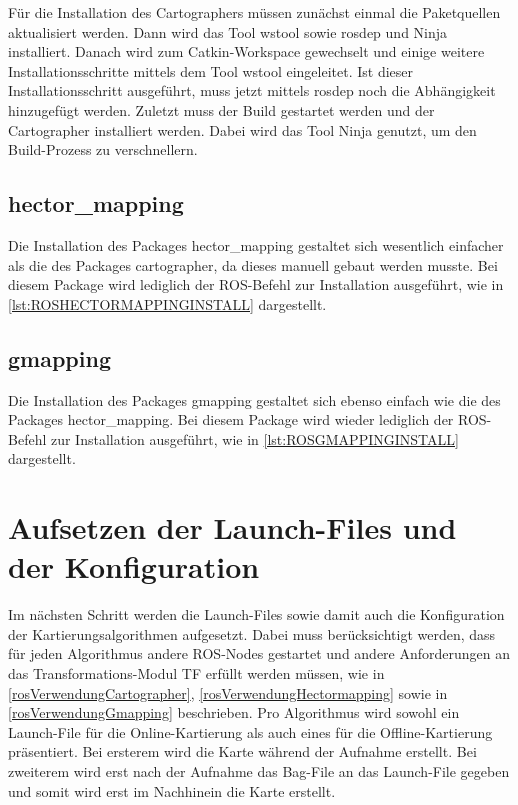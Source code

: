 Für die Installation des Cartographers müssen zunächst einmal die Paketquellen aktualisiert werden. Dann wird das Tool wstool sowie rosdep und Ninja installiert. Danach wird zum Catkin-Workspace gewechselt und einige weitere Installationsschritte mittels dem Tool wstool eingeleitet. Ist dieser Installationsschritt ausgeführt, muss jetzt mittels rosdep noch die Abhängigkeit hinzugefügt werden. Zuletzt muss der Build gestartet werden und der Cartographer installiert werden. Dabei wird das Tool Ninja genutzt, um den Build-Prozess zu verschnellern. \autocite{cartographerInstallation}



\subsection{hector\_mapping}

Die Installation des Packages hector\_mapping gestaltet sich wesentlich einfacher als die des Packages cartographer, da dieses manuell gebaut werden musste. Bei diesem Package wird lediglich der \ac{ROS}-Befehl zur Installation ausgeführt, wie in \autoref{lst:ROSHECTORMAPPINGINSTALL} dargestellt.



\subsection{gmapping}

Die Installation des Packages gmapping gestaltet sich ebenso einfach wie die des Packages hector\_mapping. Bei diesem Package wird wieder lediglich der \ac{ROS}-Befehl zur Installation ausgeführt, wie in \autoref{lst:ROSGMAPPINGINSTALL} dargestellt.




\section{Aufsetzen der Launch-Files und der Konfiguration}

Im nächsten Schritt werden die Launch-Files sowie damit auch die Konfiguration der Kartierungsalgorithmen aufgesetzt. Dabei muss berücksichtigt werden, dass für jeden Algorithmus andere \ac{ROS}-Nodes gestartet und andere Anforderungen an das Transformations-Modul TF erfüllt werden müssen, wie in \autoref{rosVerwendungCartographer},  \autoref{rosVerwendungHectormapping} sowie in \autoref{rosVerwendungGmapping} beschrieben. Pro Algorithmus wird sowohl ein Launch-File für die Online-Kartierung als auch eines für die Offline-Kartierung präsentiert. Bei ersterem wird die Karte während der Aufnahme erstellt. Bei zweiterem wird erst nach der Aufnahme das Bag-File an das Launch-File gegeben und somit wird erst im Nachhinein die Karte erstellt.

